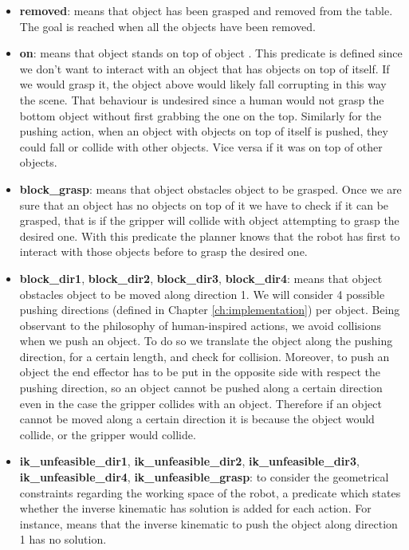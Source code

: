 \begin{itemize}
\item \textbf{removed}:  means that object  has been grasped and removed from the table. The goal is reached when all the objects have been removed. 
\item \textbf{on}: means that object  stands on top of object . This predicate is defined since we don't want to interact with an object that has objects on top of itself. If we would grasp it, the object above would likely fall corrupting in this way the scene. That behaviour is undesired since a human would not grasp the bottom object without first grabbing the one on the top. Similarly for the pushing action, when an object with objects on top of itself is pushed, they could fall or collide with other objects. Vice versa if it was on top of other objects.
\item \textbf{block\_grasp}:  means that object  obstacles  object  to be grasped. 
Once we are sure that an object has no objects on top of it we have to check if it can be grasped, that is if the gripper will collide with object  attempting to grasp the desired one. With this predicate the planner knows that the robot has first to interact with those objects before to grasp the desired one.
\item \textbf{block\_dir1}, \textbf{block\_dir2}, \textbf{block\_dir3}, \textbf{block\_dir4}:  means that object  obstacles  object  to be moved along direction 1. We will consider 4 possible pushing directions (defined in Chapter \ref{ch:implementation}) per object. Being observant to the philosophy  of human-inspired actions, we avoid collisions when we push an object. To do so we translate the object along the pushing direction, for a certain length, and check for collision. Moreover, to push an object the end effector has to be put in the opposite side with respect the pushing direction, so an object cannot be pushed along a certain direction even in the case the gripper collides with an object.
Therefore if an object cannot be moved along a certain direction it is because the object would collide, or the gripper would collide.
\item \textbf{ik\_unfeasible\_dir1}, \textbf{ik\_unfeasible\_dir2}, \textbf{ik\_unfeasible\_dir3}, \textbf{ik\_unfeasible\_dir4}, \textbf{ik\_unfeasible\_grasp}: to consider the geometrical constraints regarding the working space of the robot, a predicate which states whether the inverse kinematic has solution is added for each action. For instance,  means that the inverse kinematic to push the object  along direction 1 has no solution. %
\end{itemize}

